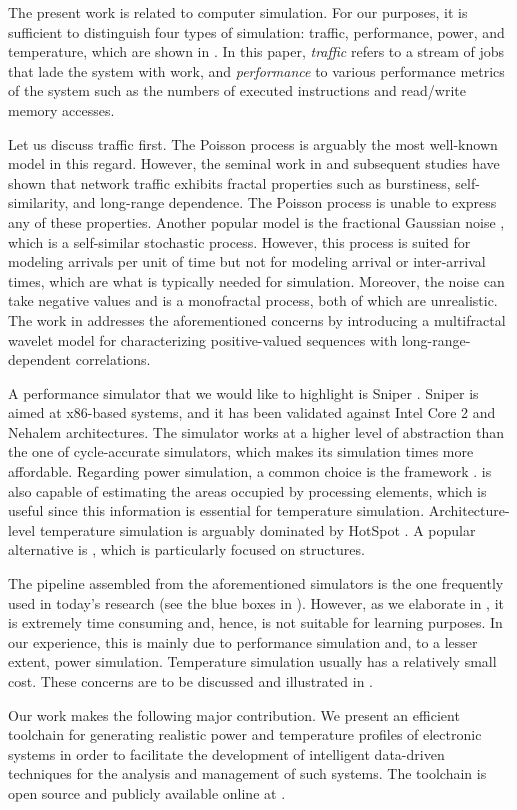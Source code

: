 The present work is related to computer simulation. For our purposes, it is
sufficient to distinguish four types of simulation: traffic, performance, power,
and temperature, which are shown in . In this paper,
\emph{traffic} refers to a stream of jobs that lade the system with work, and
\emph{performance} to various performance metrics of the system such as the
numbers of executed instructions and read/write memory accesses.

Let us discuss traffic first. The Poisson process \cite{lifshits2014} is
arguably the most well-known model in this regard. However, the seminal work in
\cite{leland1994} and subsequent studies have shown that network traffic
exhibits fractal properties such as burstiness, self-similarity, and long-range
dependence. The Poisson process is unable to express any of these properties.
Another popular model is the fractional Gaussian noise \cite{lifshits2014},
which is a self-similar stochastic process. However, this process is suited for
modeling arrivals per unit of time but not for modeling arrival or inter-arrival
times, which are what is typically needed for simulation. Moreover, the noise
can take negative values and is a monofractal process, both of which are
unrealistic. The work in \cite{riedi1999} addresses the aforementioned concerns
by introducing a multifractal wavelet model for characterizing positive-valued
sequences with long-range-dependent correlations.

A performance simulator that we would like to highlight is Sniper
\cite{carlson2011}. Sniper is aimed at x86-based systems, and it has been
validated against Intel Core 2 and Nehalem architectures. The simulator works at
a higher level of abstraction than the one of cycle-accurate simulators, which
makes its simulation times more affordable. Regarding power simulation, a common
choice is the  framework \cite{li2009}.  is also capable of
estimating the areas occupied by processing elements, which is useful since this
information is essential for temperature simulation. Architecture-level
temperature simulation is arguably dominated by HotSpot \cite{skadron2004}. A
popular alternative is  \cite{sridhar2010}, which is particularly
focused on  structures.

The pipeline assembled from the aforementioned simulators is the one frequently
used in today's research (see the blue boxes in ). However, as
we elaborate in , it is extremely time consuming and, hence,
is not suitable for learning purposes. In our experience, this is mainly due to
performance simulation and, to a lesser extent, power simulation. Temperature
simulation usually has a relatively small cost. These concerns are to be
discussed and illustrated in .

Our work makes the following major contribution. We present an efficient
toolchain for generating realistic power and temperature profiles of electronic
systems in order to facilitate the development of intelligent data-driven
techniques for the analysis and management of such systems. The toolchain is
open source and publicly available online at \cite{sources}.
